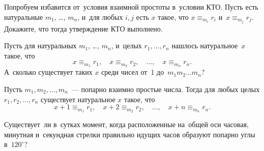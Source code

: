 \begin{problems}
\item
Попробуем избавится от~условия взаимной простоты в~условии КТО.
Пусть есть натуральные $m_{1}$, \ldots, $m_{n}$, и~для любых $i, j$ есть $x$
такое, что $x \equiv_{m_{i}} r_{i}$ и~$x \equiv_{m_{j}} r_{j}$.
Докажите, что тогда утверждение КТО выполнено.

\item
Пусть для натуральных $m_{1}$, \ldots, $m_{n}$, и~целых $r_{1}, \ldots, r_{n}$
нашлось натуральное~$x$ такое, что
\[
    x \equiv_{m_{1}} r_{1}
, \quad
    x \equiv_{m_{2}} r_{2}
, \quad \ldots, \quad
    x \equiv_{m_{n}} r_{n}
. \]
А~сколько существует таких $x$ среди чисел от~1 до~$m_{1} m_{2} \ldots m_{n}$?

\item
Пусть $m_{1}, m_{2}, \ldots, m_{n}$~--- попарно взаимно простые числа.
Тогда для любых целых $r_{1}, r_{2}, \ldots, r_{n}$ существует натуральное $x$
такое, что
\[
    x + 1 \equiv_{m_{1}} r_{1}
, \quad
    x + 2 \equiv_{m_{2}} r_{2}
, \quad \ldots, \quad
    x + n \equiv_{m_{n}} r_{n}
. \]

\item
Существует~ли в~сутках момент, когда расположенные на~общей оси часовая,
минутная и~секундная стрелки правильно идущих часов образуют попарно углы
в~$120^{\circ}$?

\end{problems}

